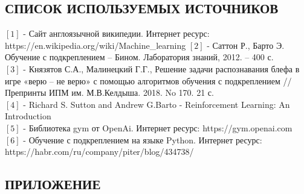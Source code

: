 \documentclass[a4paper]{report}
\theoremstyle{definition}
\theoremstyle{plain}
\theoremstyle{remark}
\theoremstyle{remark}
\theoremstyle{definition}
\begin{document}
\newpage
\begin{center}
    \section*{СПИСОК ИСПОЛЬЗУЕМЫХ ИСТОЧНИКОВ} 
\end{center}
$[1]$ - Сайт англоязычной википедии. Интернет ресурс: https://en.wikipedia.org/wiki/Machine\_learning
$[2]$ -  Саттон Р., Барто Э. Обучение с подкреплением – Бином. Лаборатория знаний,
2012. – 400 с.\\
$[3]$ - Князятов С.А., Малинецкий Г.Г.,
Решение задачи распознавания блефа в игре «верю – не верю» с помощью алгоритмов
обучения с подкреплением // Препринты ИПМ им. М.В.Келдыша. 2018. No 170. 21 с.\\
$[4]$ - Richard S. Sutton and Andrew G.Barto - Reinforcement Learning:
An Introduction \\
$[5]$ - Библиотека gym от OpenAi. Интернет ресурс: https://gym.openai.com \\
$[6]$ - Обучение с подкреплением на языке Python. Интернет ресурс: https://habr.com/ru/company/piter/blog/434738/


\newpage
\begin{center}
\section*{ПРИЛОЖЕНИЕ}
\end{center}

\end{document}
